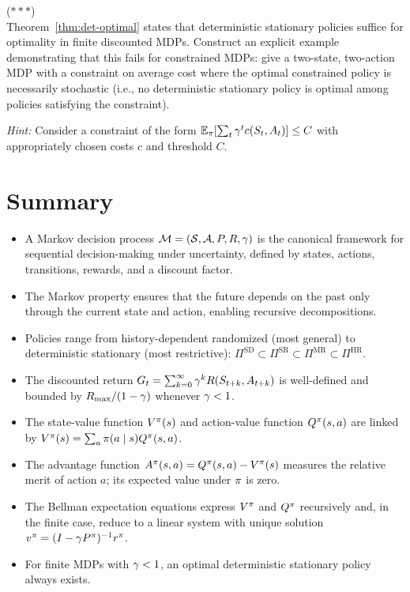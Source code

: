 \documentclass[11pt,a4paper]{article}
\begin{document}
\begin{exercise}
\textnormal{(\(***\))} \\
Theorem~\ref{thm:det-optimal} states that deterministic stationary
policies suffice for optimality in finite discounted MDPs. Construct
an explicit example demonstrating that this fails for constrained MDPs:
give a two-state, two-action MDP with a constraint on average cost
where the optimal constrained policy is necessarily stochastic (i.e.,
no deterministic stationary policy is optimal among policies satisfying
the constraint).

\textit{Hint:} Consider a constraint of the form
$\mathbb{E}_\pi[\sum_t \gamma^t c(S_t, A_t)] \leq C$ with
appropriately chosen costs $c$ and threshold $C$.
\end{exercise}


\section{Summary}
\label{sec:summary}

\begin{itemize}
    \item A Markov decision process
    $\mathcal{M} = (\mathcal{S}, \mathcal{A}, P, R, \gamma)$ is the
    canonical framework for sequential decision-making under
    uncertainty, defined by states, actions, transitions, rewards, and
    a discount factor.
    \item The Markov property ensures that the future depends on the
    past only through the current state and action, enabling recursive
    decompositions.
    \item Policies range from history-dependent randomized (most
    general) to deterministic stationary (most restrictive):
    $\Pi^{\mathrm{SD}} \subset \Pi^{\mathrm{SR}} \subset
    \Pi^{\mathrm{MR}} \subset \Pi^{\mathrm{HR}}$.
    \item The discounted return $G_t = \sum_{k=0}^\infty \gamma^k
    R(S_{t+k}, A_{t+k})$ is well-defined and bounded by
    $R_{\max}/(1-\gamma)$ whenever $\gamma < 1$.
    \item The state-value function $V^{\pi}(s)$ and action-value function
    $Q^{\pi}(s,a)$ are linked by
    $V^{\pi}(s) = \sum_a \pi(a \mid s) Q^{\pi}(s,a)$.
    \item The advantage function $A^\pi(s,a) = Q^{\pi}(s,a) - V^{\pi}(s)$
    measures the relative merit of action $a$; its expected value
    under $\pi$ is zero.
    \item The Bellman expectation equations express $V^{\pi}$ and $Q^{\pi}$
    recursively and, in the finite case, reduce to a linear system
    with unique solution $v^\pi = (I - \gamma P^\pi)^{-1}
    r^\pi$.
    \item For finite MDPs with $\gamma < 1$, an optimal
    deterministic stationary policy always exists.
\end{itemize}
\end{document}
